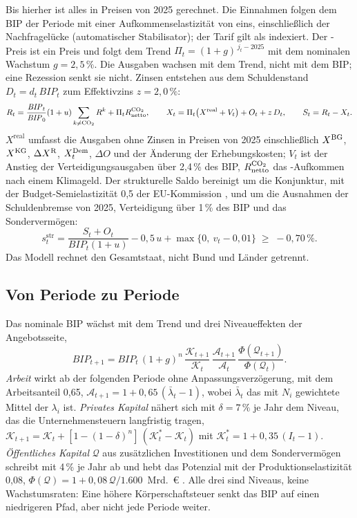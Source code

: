 Bis hierher ist alles in Preisen von 2025 gerechnet. Die Einnahmen folgen dem
BIP der Periode mit einer Aufkommenselastizität von eins, einschließlich der
Nachfragelücke (automatischer Stabilisator); der Tarif gilt als indexiert.
Der \COz-Preis ist ein Preis und folgt dem Trend
$\Pi_t = (1+g)^{\,j_t - 2025}$ mit dem nominalen Wachstum $g = 2{,}5\,\%$. Die
Ausgaben wachsen mit dem Trend, nicht mit dem BIP; eine Rezession senkt sie
nicht. Zinsen entstehen aus dem Schuldenstand $D_t = d_t\,\mathit{BIP}_t$ zum
Effektivzins $z = 2{,}0\,\%$:
\begin{equation}
  R_t = \frac{\mathit{BIP}_t}{\mathit{BIP}_0}(1+u)\sum_{k \neq \mathrm{CO_2}} R^{k} + \Pi_t R^{\mathrm{CO_2}}_{\mathrm{netto}},
  \qquad
  X_t = \Pi_t\bigl(X^{\mathrm{real}} + V_t\bigr) + O_t + z\,D_t,
  \qquad
  S_t = R_t - X_t .
\end{equation}
$X^{\mathrm{real}}$ umfasst die Ausgaben ohne Zinsen in Preisen von 2025
einschließlich $X^{\mathrm{BG}}$, $X^{\mathrm{KG}}$, $\Delta X^{\mathrm{R}}$,
$X^{\mathrm{Dem}}_t$, $\Delta O$ und der Änderung der Erhebungskosten; $V_t$ ist
der Anstieg der Verteidigungsausgaben über 2,4\,\% des BIP, $R^{\mathrm{CO_2}}_{\mathrm{netto}}$
das \COz-Aufkommen nach einem Klimageld. Der strukturelle Saldo bereinigt um
die Konjunktur, mit der Budget-Semielastizität 0,5 der EU-Kommission
\parencite{mourre2019}, und um die Ausnahmen der Schuldenbremse von 2025,
Verteidigung über 1\,\% des BIP und das Sondervermögen:
\begin{equation}
  s^{\mathrm{str}}_t = \frac{S_t + O_t}{\mathit{BIP}_t(1+u)} - 0{,}5\,u + \max\{0,\ v_t - 0{,}01\}
  \;\ge\; -0{,}70\,\% .
\end{equation}
Das Modell rechnet den Gesamtstaat, nicht Bund und Länder getrennt.

\subsection{Von Periode zu Periode}
\label{sec:dynamik}

Das nominale BIP wächst mit dem Trend und drei Niveaueffekten der
Angebotsseite,
\begin{equation}
  \mathit{BIP}_{t+1} = \mathit{BIP}_t\,(1+g)^n\,
  \frac{\mathcal K_{t+1}}{\mathcal K_t}\,\frac{\mathcal A_{t+1}}{\mathcal A_t}\,\frac{\Phi(\mathcal Q_{t+1})}{\Phi(\mathcal Q_t)} .
\end{equation}
\emph{Arbeit} wirkt ab der folgenden Periode ohne Anpassungsverzögerung, mit dem
Arbeitsanteil 0,65,
$\mathcal A_{t+1} = 1 + 0{,}65\,(\bar\lambda_t - 1)$, wobei $\bar\lambda_t$ das
mit $N_i$ gewichtete Mittel der $\lambda_i$ ist. \emph{Privates Kapital}
nähert sich mit $\delta = 7\,\%$ je Jahr dem Niveau, das die
Unternehmensteuern langfristig tragen,
$\mathcal K_{t+1} = \mathcal K_t + [1 - (1-\delta)^n]\,(\mathcal K^{*}_t - \mathcal K_t)$
mit $\mathcal K^{*}_t = 1 + 0{,}35\,(I_t - 1)$. \emph{Öffentliches Kapital}
$\mathcal Q$ aus zusätzlichen Investitionen und dem Sondervermögen schreibt mit
4\,\% je Jahr ab und hebt das Potenzial mit der Produktionselastizität 0,08,
$\Phi(\mathcal Q) = 1 + 0{,}08\,\mathcal Q/1.600$~Mrd.~\euro{}
\parencite{bom2014}. Alle drei sind Niveaus, keine Wachstumsraten: Eine höhere
Körperschaftsteuer senkt das BIP auf einen niedrigeren Pfad, aber nicht jede
Periode weiter.

